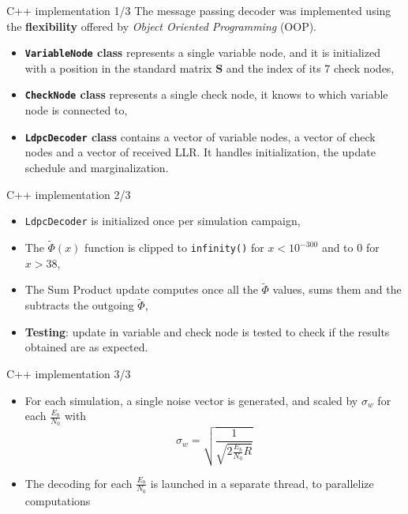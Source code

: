 \documentclass[pdf]
          {beamer}
\begin{document}
\begin{frame}{C++ implementation 1/3}
	The message passing decoder was implemented using the \textbf{flexibility} offered by \textit{Object Oriented Programming} (OOP). 
	\begin{itemize}
		\item \textbf{\texttt{VariableNode} class} represents a single variable node, and it is initialized with a position in the standard matrix $\mathbf{S}$ and the index of its 7 check nodes,
		\item \textbf{\texttt{CheckNode} class} represents a single check node, it knows to which variable node is connected to,
		\item \textbf{\texttt{LdpcDecoder} class} contains a vector of variable nodes, a vector of check nodes and a vector of received LLR. It handles initialization, the update schedule and marginalization.
	\end{itemize}
\end{frame}

\begin{frame}{C++ implementation 2/3} 
	\begin{itemize}
		\item \texttt{LdpcDecoder} is initialized once per simulation campaign,
		\item The $\tilde{\Phi}(x)$ function is clipped to \texttt{infinity()} for $x < 10^{-300}$ and to 0 for $x > 38$,
		\item The Sum Product update computes once all the $\tilde{\Phi}$ values, sums them and the subtracts the outgoing $\tilde{\Phi}$,
		\item \textbf{Testing}: update in variable and check node is tested to check if the results obtained are as expected.
	\end{itemize}
\end{frame}

\begin{frame}{C++ implementation 3/3} 
	\begin{itemize}
		\item For each simulation, a single noise vector is generated, and scaled by $\sigma_w$ for each $\frac{E_b}{N_0}$ with
		$$
			\sigma_w = \sqrt{\frac{1}{\sqrt{2 \frac{E_b}{N_0} R}}}
		$$
		\item The decoding for each $\frac{E_b}{N_0}$ is launched in a separate thread, to parallelize computations
	\end{itemize}
\end{frame}
\end{document}
